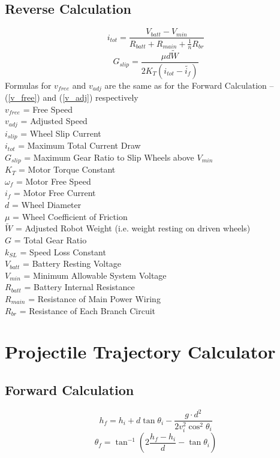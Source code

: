 \documentclass[11pt,a4paper,titlepage]{article}
\begin{document}
	\subsection{Reverse Calculation}
	\begin{equation}
	i_{tot} = \frac{V_{batt} - V_{min}}{R_{batt} + R_{main} + \frac{1}{n}R_{br}}
	\end{equation}
	\begin{equation}
	G_{slip} = \frac{\mu d \tilde{W}}{2 K_T \left( i_{tot} - \tilde{i_f} \right)}
	\end{equation}
	Formulas for $v_{free}$ and $v_{adj}$ are the same as for the Forward Calculation -- (\ref{v_free}) and (\ref{v_adj}) respectively\\
	
	$v_{free}$ = Free Speed \\
	$v_{adj}$ = Adjusted Speed \\
	$i_{slip}$ = Wheel Slip Current \\
	$i_{tot}$ = Maximum Total Current Draw \\
	$G_{slip}$ = Maximum Gear Ratio to Slip Wheels above $V_{min}$ \\
	$K_T$ = Motor Torque Constant \\
	$\omega_f$ = Motor Free Speed \\
	$i_f$ = Motor Free Current \\
	$d$ = Wheel Diameter \\
	$\mu$ = Wheel Coefficient of Friction \\
	$\tilde{W}$ = Adjusted Robot Weight (i.e. weight resting on driven wheels) \\
	$G$ = Total Gear Ratio \\
	$k_{SL}$ = Speed Loss Constant \\
	$V_{batt}$ = Battery Resting Voltage \\
	$V_{min}$ = Minimum Allowable System Voltage \\
	$R_{batt}$ = Battery Internal Resistance \\
	$R_{main}$ = Resistance of Main Power Wiring \\
	$R_{br}$ = Resistance of Each Branch Circuit
	
	\newpage
	\section{Projectile Trajectory Calculator}
	\subsection{Forward Calculation}
	\begin{equation} \label{proj_final_height}
	h_f = h_i + d \tan \theta_i - \frac{g \cdot d^2}{2 v_i^2 \cos^2 \theta_i}
	\end{equation}
	\begin{equation} \label{proj_final_angle}
	\theta_f = \tan^{-1} \left( 2 \frac{h_f - h_i}{d} - \tan \theta_i \right)
	\end{equation}
	
\end{document}
